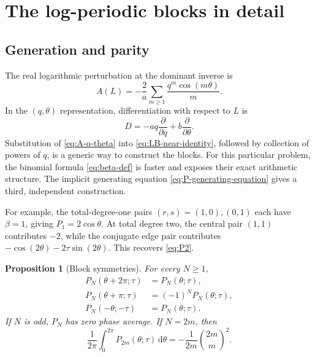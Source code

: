 \documentclass[11pt,oneside]{article}
\numberwithin{equation}{section}
\newtheorem{proposition}[theorem]{Proposition}
\newcommand{\dd}{\mathrm{d}}
\begin{document}
\section{The log-periodic blocks in detail}
\label{sec:blocks}

\subsection{Generation and parity}

The real logarithmic perturbation at the dominant inverse is
\begin{equation}
  A(L)=-\frac2a\sum_{m\ge1}\frac{q^m\cos(m\theta)}m.
  \label{eq:A-q-theta}
\end{equation}
In the \((q,\theta)\) representation, differentiation with respect to \(L\) is
\begin{equation}
  D=-a q\frac{\partial}{\partial q}
    +b\frac{\partial}{\partial\theta}.
  \label{eq:D-q-theta}
\end{equation}
Substitution of \cref{eq:A-q-theta} into \cref{eq:LB-near-identity}, followed
by collection of powers of \(q\), is a generic way to construct the blocks.
For this particular problem, the binomial formula
\cref{eq:beta-def} is faster and exposes their exact arithmetic structure.
The implicit generating equation \cref{eq:P-generating-equation} gives a third,
independent construction.

For example, the total-degree-one pairs \((r,s)=(1,0),(0,1)\) each have
\(\beta=1\), giving \(P_1=2\cos\theta\).  At total degree two, the central pair
\((1,1)\) contributes \(-2\), while the conjugate edge pair contributes
\(-\cos(2\theta)-2\tau\sin(2\theta)\).  This recovers \cref{eq:P2}.

\begin{proposition}[Block symmetries]
\label{prop:block-symmetries}
For every \(N\ge1\),
\begin{align}
  P_N(\theta+2\pi;\tau)&=P_N(\theta;\tau),
  \label{eq:PN-periodic}\\
  P_N(\theta+\pi;\tau)&=(-1)^N P_N(\theta;\tau),
  \label{eq:PN-antiperiodic}\\
  P_N(-\theta;-\tau)&=P_N(\theta;\tau).
  \label{eq:PN-reflection}
\end{align}
If \(N\) is odd, \(P_N\) has zero phase average.  If \(N=2m\), then
\begin{equation}
  \frac1{2\pi}\int_0^{2\pi}P_{2m}(\theta;\tau)\,\dd\theta
  =-\frac1{2m}\binom{2m}{m}^2.
  \label{eq:PN-average}
\end{equation}
\end{proposition}
\end{document}
